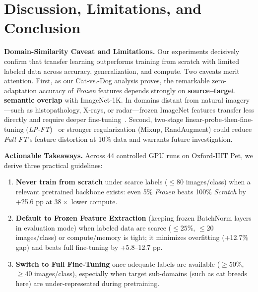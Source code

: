 \documentclass[sigconf,nonacm]{acmart}
\begin{document}
\section{Discussion, Limitations, and Conclusion}
\textbf{Domain-Similarity Caveat and Limitations.} Our experiments decisively confirm that transfer learning outperforms training from scratch with limited labeled data across accuracy, generalization, and compute. Two caveats merit attention. First, as our Cat-vs.-Dog analysis proves, the remarkable zero-adaptation accuracy of \emph{Frozen} features depends strongly on \textbf{source--target semantic overlap} with ImageNet-1K. In domains distant from natural imagery---such as histopathology, X-rays, or radar---frozen ImageNet features transfer less directly and require deeper fine-tuning~\cite{raghu2019transfusion}. Second, two-stage linear-probe-then-fine-tuning (\emph{LP-FT})~\cite{kumar2022finetuning} or stronger regularization (Mixup, RandAugment) could reduce \emph{Full FT}'s feature distortion at 10\% data and warrants future investigation.

\textbf{Actionable Takeaways.} Across 44 controlled GPU runs on Oxford-IIIT Pet, we derive three practical guidelines:
\begin{enumerate}
  \item \textbf{Never train from scratch} under scarce labels ($\le 80$ images/class) when a relevant pretrained backbone exists: even 5\% \emph{Frozen} beats 100\% \emph{Scratch} by +25.6 pp at $38\times$ lower compute.
  \item \textbf{Default to Frozen Feature Extraction} (keeping frozen BatchNorm layers in evaluation mode) when labeled data are scarce ($\le 25\%$, $\le 20$ images/class) or compute/memory is tight; it minimizes overfitting (+12.7\% gap) and beats full fine-tuning by +5.8--12.7 pp.
  \item \textbf{Switch to Full Fine-Tuning} once adequate labels are available ($\ge 50\%$, $\ge 40$ images/class), especially when target sub-domains (such as cat breeds here) are under-represented during pretraining.
\end{enumerate}



\end{document}

